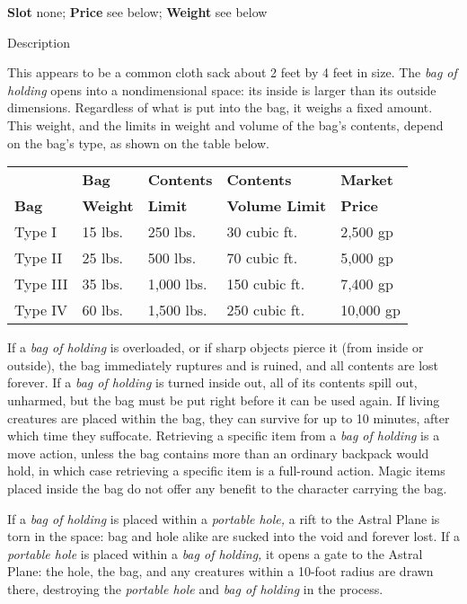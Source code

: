 \textbf{Slot} none; \textbf{Price} see below; \textbf{Weight }see below
				
Description
				
This appears to be a common cloth sack about 2 feet by 4 feet in size. The \textit{bag of holding }opens into a nondimensional space: its inside is larger than its outside dimensions. Regardless of what is put into the bag, it weighs a fixed amount. This weight, and the limits in weight and volume of the bag's contents, depend on the bag's type, as shown on the table below.
				
\setlength{\tabcolsep}{1pt}
\begin{tabular}{lllll}
             & \textbf{Bag}    & \textbf{Contents}& \textbf{Contents}     & \textbf{Market} \\
\textbf{Bag} & \textbf{Weight} & \textbf{Limit}   & \textbf{Volume Limit} & \textbf{Price}\\
Type I & 15 lbs. & 250 lbs. & 30 cubic ft. & 2,500 gp\\
Type II & 25 lbs. & 500 lbs. & 70 cubic ft. & 5,000 gp\\
Type III & 35 lbs. & 1,000 lbs. & 150 cubic ft. & 7,400 gp\\
Type IV & 60 lbs. & 1,500 lbs. & 250 cubic ft. & 10,000 gp\\
\end{tabular}
				
If a \textit{bag of holding} is overloaded, or if sharp objects pierce it (from inside or outside), the bag immediately ruptures and is ruined, and all contents are lost forever. If a \textit{bag of holding }is turned inside out, all of its contents spill out, unharmed, but the bag must be put right before it can be used again. If living creatures are placed within the bag, they can survive for up to 10 minutes, after which time they suffocate. Retrieving a specific item from a \textit{bag of holding }is a move action, unless the bag contains more than an ordinary backpack would hold, in which case retrieving a specific item is a full-round action. Magic items placed inside the bag do not offer any benefit to the character carrying the bag.
				
If a \textit{bag of holding }is placed within a \textit{portable hole,} a rift to the Astral Plane is torn in the space: bag and hole alike are sucked into the void and forever lost. If a \textit{portable hole }is placed within a \textit{bag of holding, }it opens a gate to the Astral Plane: the hole, the bag, and any creatures within a 10-foot radius are drawn there, destroying the \textit{portable hole }and \textit{bag of holding }in the process. 
				
